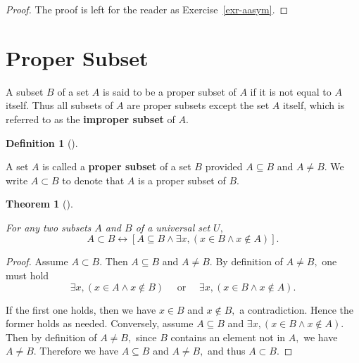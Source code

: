 \documentclass[
  letterpaper,
  10pt,
  reqno,
  twopage,
  openany]{book}
\theoremstyle{plain}
\theoremstyle{definition}
\theoremstyle{definition}
\newtheorem{definition}{Definition}[chapter]
\theoremstyle{definition}
\theoremstyle{plain}
\theoremstyle{plain}
\newtheorem{theorem}{Theorem}[chapter]
\theoremstyle{remark}
\begin{document}
\begin{proof}

The proof is left for the reader as Exercise~\ref{exr-aasym}.

\end{proof}

\hypertarget{proper-subset}{%
\section{Proper Subset}\label{proper-subset}}

A subset \(B\) of a set \(A\) is said to be a proper subset of \(A\) if
it is not equal to \(A\) itself. Thus all subsets of \(A\) are proper
subsets except the set \(A\) itself, which is referred to as the
 \textbf{improper subset} of \(A.\)

\leavevmode{}%
\begin{definition}[]\label{def-proper-subset}

A set \(A\) is called a  \textbf{proper subset} of
a set \(B\) provided \(A\subseteq B\) and \(A\neq B.\) We write
\(A\subset B\) to denote that \(A\) is a proper subset of \(B.\)

\end{definition}

\leavevmode{}%
\begin{theorem}[]\label{thm-subseteq}

For any two subsets \(A\) and \(B\) of a universal set \(U,\)
\begin{equation}
A\subset B \leftrightarrow [A\subseteq B \land \exists x, (x\in B \land x\notin A)].
\label{eqsets}
\end{equation}

\end{theorem}

\begin{proof}

Assume \(A\subset B.\) Then \(A\subseteq B\) and \(A\neq B.\) By
definition of \(A\neq B,\) one must hold \[
\exists x, (x\in A\land x\notin B)
\quad \text{ or }\quad 
\exists x, (x\in B \land x\notin A).
\]

If the first one holds, then we have \(x\in B\) and \(x\notin B,\) a
contradiction. Hence the former holds as needed. Conversely, assume
\(A\subseteq B\) and \({\exists x, (x\in B \land x\notin A).}\) Then by
definition of \(A\neq B,\) since \(B\) contains an element not in \(A,\)
we have \(A\neq B.\) Therefore we have \(A\subseteq B\) and \(A\neq B,\)
and thus \(A\subset B.\)

\end{proof}
\end{document}
